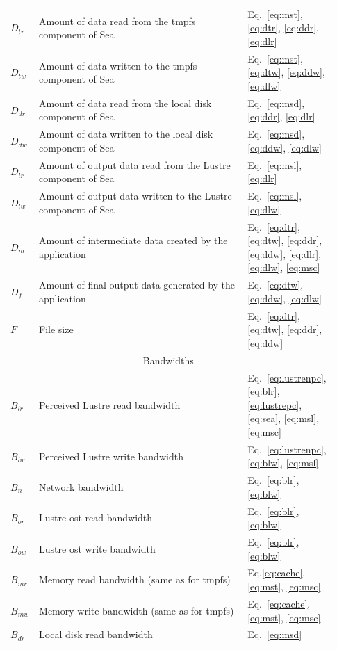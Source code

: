 \documentclass{report}
\begin{document}
\begin{table}
\begin{tabular}{|p{0.03\linewidth}|p{0.7\linewidth}|p{0.2\linewidth}|}
     $D_{tr}$ & Amount of data read from the tmpfs component of Sea & Eq.~\ref{eq:mst}, \ref{eq:dtr}, \ref{eq:ddr}, \ref{eq:dlr} \\
     $D_{tw}$ & Amount of data written to the tmpfs component of Sea & Eq.~\ref{eq:mst}, \ref{eq:dtw}, \ref{eq:ddw}, \ref{eq:dlw} \\
     $D_{dr}$ & Amount of data read from the local disk component of Sea & Eq.~\ref{eq:msd}, \ref{eq:ddr}, \ref{eq:dlr} \\
     $D_{dw}$ & Amount of data written to the local disk component of Sea & Eq.~\ref{eq:msd}, \ref{eq:ddw}, \ref{eq:dlw} \\
     $D_{lr}$ & Amount of output data read from the Lustre component of Sea & Eq.~\ref{eq:msl}, \ref{eq:dlr} \\
     $D_{lw}$ & Amount of output data written to the Lustre component of Sea & Eq.~\ref{eq:msl}, \ref{eq:dlw} \\
     $D_{m}$ & Amount of intermediate data created by the application & Eq.~\ref{eq:dtr}, \ref{eq:dtw}, \ref{eq:ddr}, \ref{eq:ddw}, \ref{eq:dlr}, \ref{eq:dlw}, \ref{eq:msc} \\
     $D_{f}$ & Amount of final output data generated by the application & Eq.~\ref{eq:dtw}, \ref{eq:ddw}, \ref{eq:dlw} \\ 
     $F$ & File size & Eq.~\ref{eq:dtr}, \ref{eq:dtw}, \ref{eq:ddr}, \ref{eq:ddw}\\
     \hline
     \multicolumn{3}{|c|}{Bandwidths} \\
     \hline
     $B_{lr}$ & Perceived Lustre read bandwidth & Eq.~\ref{eq:lustrenpc}, \ref{eq:blr}, \ref{eq:lustrepc}, \ref{eq:sea}, \ref{eq:msl}, \ref{eq:msc}\\
     $B_{lw}$ & Perceived Lustre write bandwidth & Eq.~\ref{eq:lustrenpc}, \ref{eq:blw}, \ref{eq:msl}\\
     $B_{n}$ & Network bandwidth & Eq.~\ref{eq:blr}, \ref{eq:blw}\\
     $B_{or}$ & Lustre \gls{ost} read bandwidth & Eq.~\ref{eq:blr}, \ref{eq:blw}\\
     $B_{ow}$ & Lustre \gls{ost} write bandwidth & Eq.~\ref{eq:blr}, \ref{eq:blw}\\
     $B_{mr}$ & Memory read bandwidth (same as for tmpfs) & Eq.\ref{eq:cache}, \ref{eq:mst}, \ref{eq:msc}\\
     $B_{mw}$ & Memory write bandwidth (same as for tmpfs) & Eq.~\ref{eq:cache}, \ref{eq:mst}, \ref{eq:msc}\\
     $B_{dr}$ & Local disk read bandwidth & Eq.~\ref{eq:msd}\\

\end{tabular}
\end{table}
\end{document}
